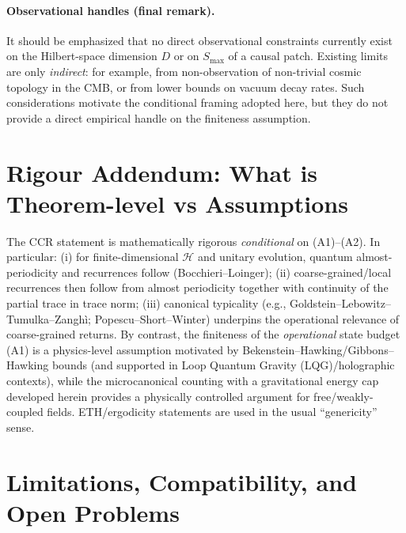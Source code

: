 \documentclass[12pt]{article}
\newcommand{\Smax}{S_{\max}}
\theoremstyle{remark}
\begin{document}
\paragraph{Observational handles (final remark).}
It should be emphasized that no direct observational constraints currently exist on the
Hilbert-space dimension $D$ or on $\Smax$ of a causal patch. Existing limits are only
\emph{indirect}: for example, from non-observation of non-trivial cosmic topology in the CMB,
or from lower bounds on vacuum decay rates. Such considerations motivate the conditional
framing adopted here, but they do not provide a direct empirical handle on the finiteness
assumption.


\section{Rigour Addendum: What is Theorem-level vs Assumptions}\label{sec:rigour-addendum}
The CCR statement is mathematically rigorous \emph{conditional} on (A1)--(A2). In particular:
(i) for finite-dimensional $\mathcal H$ and unitary evolution, quantum almost-periodicity and recurrences follow (Bocchieri--Loinger);
(ii) coarse-grained/local recurrences then follow from almost periodicity together with continuity of the partial trace in trace norm;
(iii) canonical typicality (e.g., Goldstein--Lebowitz--Tumulka--Zangh\`i; Popescu--Short--Winter) underpins the operational relevance of coarse-grained returns.
By contrast, the finiteness of the \emph{operational} state budget (A1) is a physics-level assumption motivated by Bekenstein--Hawking/Gibbons--Hawking bounds (and supported in Loop Quantum Gravity (LQG)/holographic contexts), while the microcanonical counting with a gravitational energy cap developed herein provides a physically controlled argument for free/weakly-coupled fields. ETH/ergodicity statements are used in the usual ``genericity'' sense.


\section{Limitations, Compatibility, and Open Problems}
\end{document}
